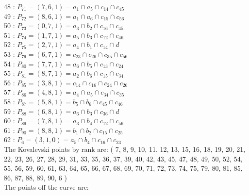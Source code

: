 48 : $P_{71}=( 7, 6, 1 ) = a_{1} \cap a_{5} \cap c_{14} \cap c_{45}$\\
49 : $P_{72}=( 8, 6, 1 ) = a_{1} \cap a_{6} \cap c_{15} \cap c_{56}$\\
50 : $P_{73}=( 0, 7, 1 ) = a_{3} \cap b_{2} \cap c_{16} \cap c_{45}$\\
51 : $P_{74}=( 1, 7, 1 ) = a_{5} \cap b_{3} \cap c_{12} \cap c_{46}$\\
52 : $P_{75}=( 2, 7, 1 ) = a_{4} \cap b_{1} \cap c_{14} \cap d$\\
53 : $P_{79}=( 6, 7, 1 ) = c_{23} \cap c_{26} \cap c_{35} \cap c_{56}$\\
54 : $P_{80}=( 7, 7, 1 ) = a_{6} \cap b_{5} \cap c_{13} \cap c_{24}$\\
55 : $P_{81}=( 8, 7, 1 ) = a_{2} \cap b_{6} \cap c_{15} \cap c_{34}$\\
56 : $P_{85}=( 3, 8, 1 ) = c_{14} \cap c_{16} \cap c_{24} \cap c_{26}$\\
57 : $P_{86}=( 4, 8, 1 ) = a_{4} \cap a_{5} \cap c_{34} \cap c_{35}$\\
58 : $P_{87}=( 5, 8, 1 ) = b_{5} \cap b_{6} \cap c_{45} \cap c_{46}$\\
59 : $P_{88}=( 6, 8, 1 ) = a_{6} \cap b_{3} \cap c_{36} \cap d$\\
60 : $P_{89}=( 7, 8, 1 ) = a_{3} \cap b_{4} \cap c_{12} \cap c_{56}$\\
61 : $P_{90}=( 8, 8, 1 ) = b_{1} \cap b_{2} \cap c_{15} \cap c_{25}$\\
62 : $P_{6}=( 3, 1, 0 ) = a_{5} \cap b_{4} \cap c_{16} \cap c_{23}$\\
The Kovalevski points by rank are: 
( 7, 8, 9, 10, 11, 12, 13, 15, 16, 18, 19, 20, 21, 22, 23, 26, 27, 28, 29, 31, 33, 35, 36, 37, 39, 40, 42, 43, 45, 47, 48, 49, 50, 52, 54, 55, 56, 59, 60, 61, 63, 64, 65, 66, 67, 68, 69, 70, 71, 72, 73, 74, 75, 79, 80, 81, 85, 86, 87, 88, 89, 90, 6 )\\
The points off the curve are: \\
